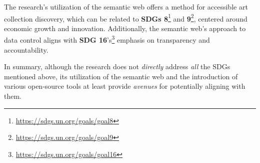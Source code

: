 The research's utilization of the semantic web offers a method for accessible art collection discovery, which can be related to \textbf{SDGs 8}\footnote{\url{https://sdgs.un.org/goals/goal8}} and \textbf{9}\footnote{\url{https://sdgs.un.org/goals/goal9}}, centered around economic growth and innovation. Additionally, the semantic web's approach to data control aligns with \textbf{SDG 16}'s\footnote{\url{https://sdgs.un.org/goals/goal16}} emphasis on transparency and accountability.

In summary, although the research does not \textit{directly} address \textit{all} the SDGs mentioned above, its utilization of the semantic web and the introduction of various open-source tools at least provide \textit{avenues} for potentially aligning with them.